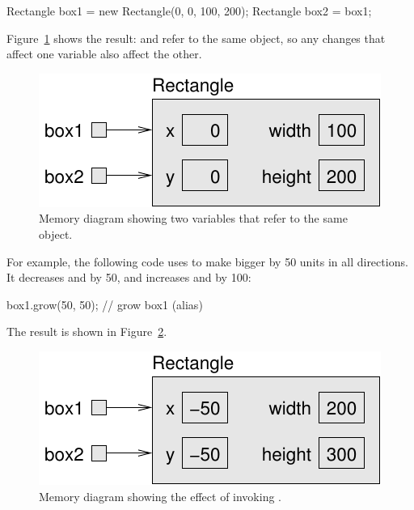 \begin{code}
Rectangle box1 = new Rectangle(0, 0, 100, 200);
Rectangle box2 = box1;
\end{code}

Figure~\ref{fig.aliasing} shows the result:  and  refer to the same object, so any changes that affect one variable also affect the other.

\begin{figure}[!ht]
\begin{center}
\includegraphics{figs/aliasing.pdf}
\caption{Memory diagram showing two variables that refer to the same  object.}
\label{fig.aliasing}
\end{center}
\end{figure}

For example, the following code uses  to make  bigger by 50 units in all directions.
It decreases  and  by 50, and increases  and  by 100:

\begin{code}
box1.grow(50, 50);                // grow box1 (alias)
\end{code}

The result is shown in Figure~\ref{fig.aliasing2}.

\begin{figure}[!ht]
\begin{center}
\includegraphics{figs/aliasing2.pdf}
\caption{Memory diagram showing the effect of invoking .}
\label{fig.aliasing2}
\end{center}
\end{figure}

